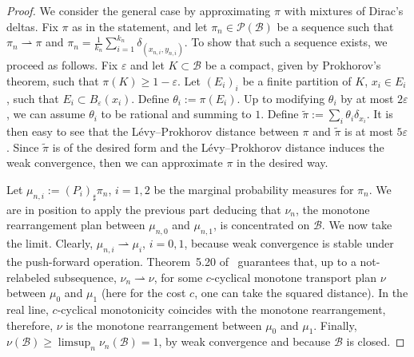 \documentclass[12pt,a4paper]{amsart}
\theoremstyle{plain}
\theoremstyle{definition}
\numberwithin{equation}{section}
\let\temp\phi
\let\phi\varphi
\let\temp\epsilon
\let\epsilon\varepsilon
\let\varepsilon\temp
\newcommand{\weak}{\rightharpoonup}
\newcommand{\Prob}{\mathcal P}
\begin{document}
\begin{proof}
We consider the general case by approximating $\pi$ with mixtures of
Dirac's deltas.
%
Fix $\pi$ as in the statement, and let $\pi_n\in\Prob(\mathcal{B})$ be a sequence such that $\pi_n\weak \pi$
and $\pi_n=\frac{1}{k_n}\sum_{i=1}^{k_n}\delta_{(x_{n,i},y_{n,i})}$.
%
To show that such a sequence exists, we proceed as follows.
%
Fix $\epsilon$ and let $K\subset \mathcal{B}$ be a compact, given by Prokhorov's
theorem, such that $\pi(K)\geq 1-\epsilon$.
%
Let $(E_i)_{i}$ be a finite partition of $K$, $x_i\in E_i$, such that
$E_i\subset B_{\epsilon}(x_i)$.
%
Define $\theta_i:=\pi(E_i)$.
%
Up to modifying $\theta_i$ by at most $2\epsilon$, we can assume $\theta_i$ to be
rational and summing to $1$.
%
Define $\tilde \pi:=\sum_i\theta_i\delta_{x_i}$.
%
It is then easy to see that the L\'evy--Prokhorov distance between
$\pi$ and $\tilde\pi$ is at most $5\epsilon$.
%
Since $\tilde\pi$ is of the desired form and the L\'evy--Prokhorov
distance induces the weak convergence, then we can approximate $\pi$
in the desired way.

Let $\mu_{n,i}:=(P_i)_{\sharp}\pi_n$, $i=1,2$ be the marginal probability 
measures for $\pi_n$.
%
We are in position to apply the previous part deducing that $\nu_n$, 
the monotone rearrangement plan between $\mu_{n,0}$ and $\mu_{n,1}$,
is concentrated on $\mathcal{B}$.
%
We now take the limit.
%
Clearly, $\mu_{n,i}\weak \mu_i$, $i=0,1$, because weak convergence is
stable under the push-forward operation.
%
Theorem~5.20 of~\cite{villani:oldandnew} guarantees that, up to a
not-relabeled subsequence, $\nu_n\weak\nu$, for some $c$-cyclical
monotone transport plan $\nu$ between $\mu_0$ and $\mu_1$ (here for
the cost $c$, one can take the squared distance).
%
In the real line, $c$-cyclical monotonicity coincides with the
monotone rearrangement, therefore, $\nu$ is the monotone rearrangement
between $\mu_0$ and $\mu_1$.
%
Finally, $\nu(\mathcal{B})\geq\limsup_n \nu_n(\mathcal{B})=1$, by weak
convergence and because $\mathcal{B}$ is closed.
\end{proof}
\end{document}
